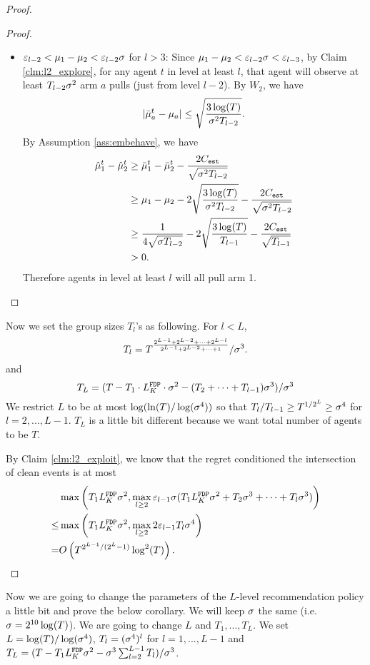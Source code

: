 \begin{proof}
\begin{proof}
\begin{itemize}
\item $\varepsilon_{l-2} < \mu_1 - \mu_2 < \varepsilon_{l-2}\sigma$ for $l >3$: Since $\mu_1-\mu_2 < \varepsilon_{l-2}\sigma < \varepsilon_{l-3}$, by Claim \ref{clm:l2_explore}, for any agent $t$ in level at least $l$, that agent will observe at least $T_{l-2}\sigma^2$ arm $a$ pulls (just from level $l-2$). By $W_2$, we have
\[
|\bar{\mu}_a^t - \mu_a| \leq \sqrt{\frac{3\log(T)}{\sigma^2T_{l-2}}}.
\]
By Assumption \ref{ass:embehave}, we have
\begin{align*}
\hat{\mu}_1^t - \hat{\mu}_2^t &\geq \bar{\mu}_1^t - \bar{\mu}_2^t - \frac{2C_{\mathtt{est}}}{\sqrt{\sigma^2T_{l-2}}} \\
&\geq \mu_1 -\mu_2 - 2 \sqrt{\frac{3\log(T)}{\sigma^2T_{l-2}}}- \frac{2C_{\mathtt{est}}}{\sqrt{\sigma^2T_{l-2}}} \\
&\geq\frac{1}{4\sqrt{\sigma T_{l-2}}} -  2 \sqrt{\frac{3\log(T)}{T_{l-1}}}- \frac{2C_{\mathtt{est}}}{\sqrt{T_{l-1}}} \\
&>0.
\end{align*}
Therefore agents in level at least $l$ will all pull arm 1.
\end{itemize}
\end{proof}

Now we set the group sizes $T_l$'s as following. For $l < L$,
\[
T_l = T^{\frac{2^{L-1} + 2^{L-2} + \cdots + 2^{L-l}}{2^{L-1}+ 2^{L-2} + \cdots + 1}}/\sigma^3.
\]
and
\[
T_L = (T - T_1 \cdot L^\mathtt{FDP}_K\cdot \sigma^2 - (T_2 + \cdots + T_{l-1}) \sigma^3) /\sigma^3
\]
We restrict $L$ to be at most $\log(\ln(T)/\log(\sigma^4))$ so that $T_l / T_{l-1} \geq T^{1/2^L} \geq \sigma^4$ for $l = 2,...,L-1$. $T_L$ is a little bit different because we want total number of agents to be $T$.

By Claim \ref{clm:l2_exploit}, we know that the regret conditioned the intersection of clean events is at most
\begin{align*}
&\max\left( T_1L^\mathtt{FDP}_K \sigma^2 , \max_{l \geq 2} \varepsilon_{l-1}\sigma(T_1L^\mathtt{FDP}_K \sigma^2 + T_2 \sigma^3 + \cdots + T_l\sigma^3)\right) \\
\leq & \max\left( T_1L^\mathtt{FDP}_K \sigma^2 , \max_{l \geq 2} 2 \varepsilon_{l-1} T_l \sigma^4 \right)\\
= &O\left(T^{2^{L-1}/(2^L-1)} \log^2(T) \right).
\end{align*}
\end{proof}

Now we are going to change the parameters of the $L$-level recommendation policy a little bit and prove the below corollary. We will keep $\sigma$ the same (i.e. $\sigma = 2^{10}\log(T)$). We are going to change $L$ and $T_1,...,T_L$. We set $L = \log(T)/\log(\sigma^4)$, $T_l = (\sigma^4)^l$ for $l=1,...,L-1$ and $T_L = (T - T_1 L^\mathtt{FDP}_K \sigma^2 - \sigma^3\sum_{l=2}^{L-1} T_l)/\sigma^3$.

